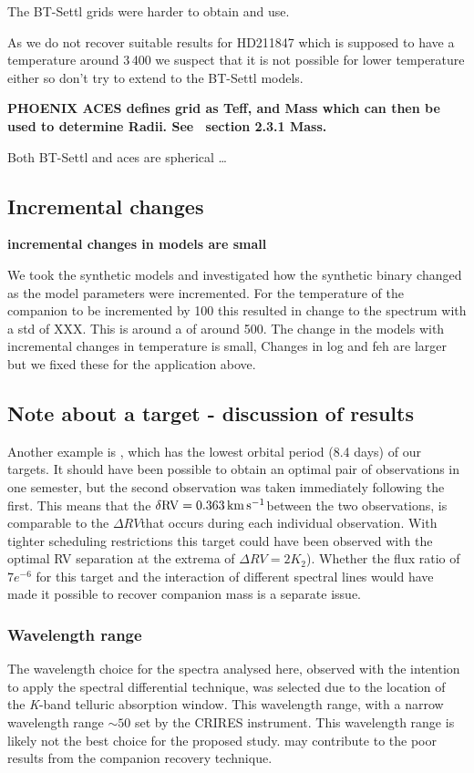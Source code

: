 The {BT-Settl} grids were harder to obtain and use.

As we do not recover suitable results for HD211847 which is supposed to have a temperature around 3\,400\K{} we suspect that it is not possible for lower temperature either so don't try to extend to the {BT-Settl} models.


\textbf{
    PHOENIX ACES defines grid as Teff,\logg{} and Mass which can then be used to determine Radii. See~\citep{husser_new_2013} section 2.3.1 Mass.}

Both {BT-Settl} and aces are spherical
\ldots{}




\subsection{Incremental changes}
\textbf{incremental changes in models are small}

We took the synthetic models and investigated how the synthetic binary changed as the model parameters were incremented.  For the temperature of the companion to be incremented by 100\K{} this resulted in change to the spectrum with a std of XXX. This is around a \snr{} of around 500.
The change in the models with incremental changes in temperature is small, Changes in log and feh are larger but we fixed these for the application above.





\subsection{Note about a target - discussion of results}
Another example is , which has the lowest orbital period (8.4 days) of our targets. It should have been possible to obtain an optimal pair of observations in one semester, but the second observation was taken immediately following the first. This means that the \(\rm \delta {RV} = 0.363\,\si{\kilo\meter\per\second}{}\)between the two observations, is comparable to the \(\Delta {RV}\)that occurs during each individual observation. With tighter scheduling restrictions this target could have been observed with the optimal {RV} separation at the extrema of \(\Delta {RV}=2 K_{2}\)). Whether the flux ratio of \(7e^{-6}\) for this target and the interaction of different spectral lines would have made it possible to recover companion mass is a separate issue.



\subsubsection{Wavelength range}
The wavelength choice for the spectra analysed here, observed with the intention to apply the spectral differential technique, was selected due to the location of the \emph{K}-band telluric absorption window. This wavelength range, with a narrow wavelength range \(\sim50\)\nm{} set by the {CRIRES} instrument. This wavelength range is likely not the best choice for the proposed study.  may contribute to the poor results from the companion recovery technique.

